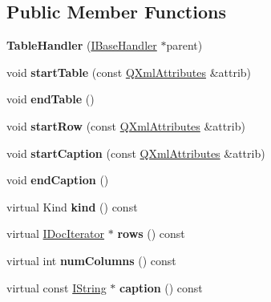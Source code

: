 \subsection*{Public Member Functions}
\begin{DoxyCompactItemize}
\item 
\mbox{\label{class_table_handler_a9e0613ea8ae5607d225932bcc9f62215}} 
{\bfseries Table\+Handler} (\mbox{\hyperlink{class_i_base_handler}{I\+Base\+Handler}} $\ast$parent)
\item 
\mbox{\label{class_table_handler_a09ce57d19969e097b1bd637923672003}} 
void {\bfseries start\+Table} (const \mbox{\hyperlink{class_q_xml_attributes}{Q\+Xml\+Attributes}} \&attrib)
\item 
\mbox{\label{class_table_handler_ad906939d05d7140280515a0f2b0f0031}} 
void {\bfseries end\+Table} ()
\item 
\mbox{\label{class_table_handler_a907149d6a57a20bbb142d60d457209fe}} 
void {\bfseries start\+Row} (const \mbox{\hyperlink{class_q_xml_attributes}{Q\+Xml\+Attributes}} \&attrib)
\item 
\mbox{\label{class_table_handler_a8e3d08c867677c9e2d9bac9b53b781e2}} 
void {\bfseries start\+Caption} (const \mbox{\hyperlink{class_q_xml_attributes}{Q\+Xml\+Attributes}} \&attrib)
\item 
\mbox{\label{class_table_handler_a2fb38f8951f0982bcd2a17d0d1a2182f}} 
void {\bfseries end\+Caption} ()
\item 
\mbox{\label{class_table_handler_afb805c4f6f2e64e6a21e88b73466d9a9}} 
virtual Kind {\bfseries kind} () const
\item 
\mbox{\label{class_table_handler_a90715ee8d5387e2acde993b4ddd66a5f}} 
virtual \mbox{\hyperlink{class_i_doc_iterator}{I\+Doc\+Iterator}} $\ast$ {\bfseries rows} () const
\item 
\mbox{\label{class_table_handler_a2d106b897927d7de6e15ab28512e7313}} 
virtual int {\bfseries num\+Columns} () const
\item 
\mbox{\label{class_table_handler_a86841f094624273b21e40e160dfd5127}} 
virtual const \mbox{\hyperlink{class_i_string}{I\+String}} $\ast$ {\bfseries caption} () const
\end{DoxyCompactItemize}
